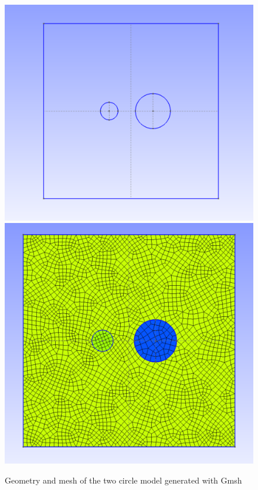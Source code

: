 \begin{figure}[htbp]
\begin{centering}
\includegraphics[width=0.481\columnwidth]{figures/Gmsh_geo.pdf}
\hspace{2mm}
\includegraphics[width=0.43\columnwidth]{figures/Gmsh_Msh.pdf}
\end{centering}
\caption{Geometry and mesh of the two circle model generated with Gmsh}
\label{fig:Gmsh-example}
\end{figure}

